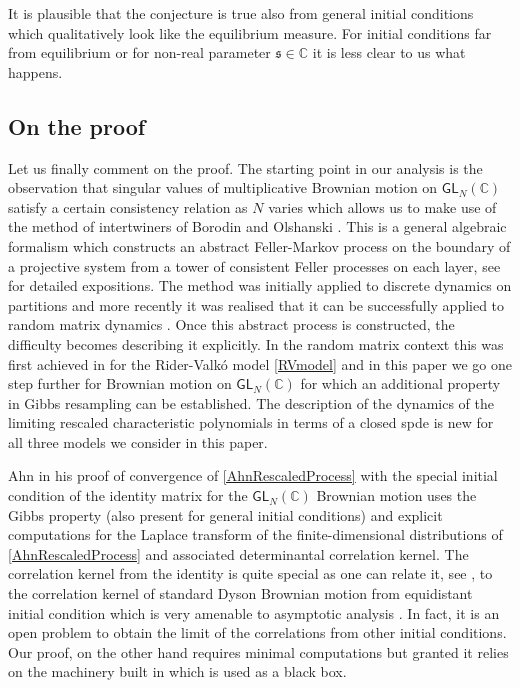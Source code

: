 \documentclass[]{article}
\begin{document}
It is plausible that the conjecture is true also from general initial conditions which qualitatively look like the equilibrium measure. For initial conditions far from equilibrium or for non-real parameter $\mathfrak{s}\in \mathbb{C}$ it is less clear to us what happens.

\subsection{On the proof}

Let us finally comment on the proof. The starting point in our analysis is the observation that singular values of multiplicative Brownian motion on $\mathsf{GL}_N(\mathbb{C})$ satisfy a certain consistency relation as $N$ varies which allows us to make use of the method of intertwiners of Borodin and Olshanski \cite{BorodinOlshanskiMarkov,OlshanskiICM,OlshanskiLectureNotes}. This is a general algebraic formalism which constructs an abstract Feller-Markov process on the boundary of a projective system from a tower of consistent Feller processes on each layer, see \cite{BorodinOlshanskiMarkov,OlshanskiLectureNotes,AM24} for detailed expositions. The method was initially applied to discrete dynamics on partitions \cite{BorodinOlshanskiMarkov,BorodinOlshanskiThoma,BorodinGorin,OlshanskiApproximation,OlshanskiLectureNotes,OlshanskiICM} and more recently it was realised that it can be successfully applied to random matrix dynamics \cite{HuaPickrellDiffusions,AM24,BufetovKawamoto,BufetovKawamoto2}. Once this abstract process is constructed, the difficulty becomes describing it explicitly. In the random matrix context this was first achieved in \cite{AM24} for the Rider-Valk\'{o} model \eqref{RVmodel} and in this paper we go one step further for Brownian motion on $\mathsf{GL}_N(\mathbb{C})$ for which an additional property in Gibbs resampling can be established. The description of the dynamics of the limiting rescaled characteristic polynomials in terms of a closed spde is new for all three models we consider in this paper.

Ahn in his proof of convergence of \eqref{AhnRescaledProcess} with the special initial condition of the identity matrix for the $\mathsf{GL}_N(\mathbb{C})$ Brownian motion uses the Gibbs property (also present for general initial conditions) and explicit computations for the Laplace transform of the finite-dimensional distributions of \eqref{AhnRescaledProcess} and associated determinantal correlation kernel. The correlation kernel from the identity is quite special as one can relate it, see \cite{JonesOConnell,Katori,KatoriTakahashi}, to the correlation kernel of standard Dyson Brownian motion from equidistant initial condition \cite{JohanssonUniversality,JohanssonNumberVariance, KatoriTanemura} which is very amenable to asymptotic analysis \cite{Ahn,Mustazee}. In fact, it is an open problem to obtain the limit of the correlations from other initial conditions. Our proof, on the other hand requires minimal computations but granted it relies on the machinery built in \cite{AM24} which is used as a black box.
\end{document}
